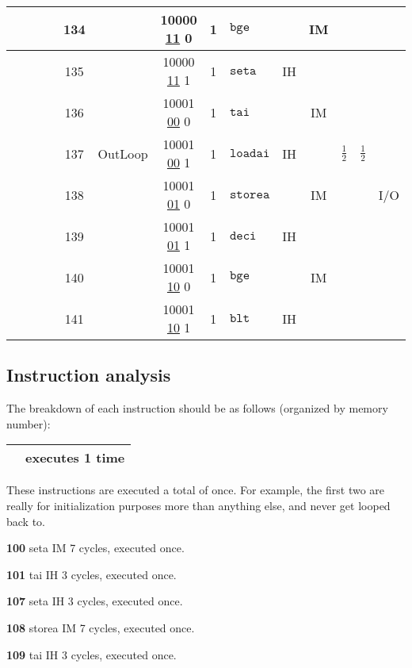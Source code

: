 \documentclass[a4paper]{article}
\begin{document}
\begin{center}
\begin{tabular}{|c|c|c|c|c|c|c|c|l|c|c|c|c|c|}
\hline
& & & \cellcolor{red} & 134 &  & 10000 \underline{11} 0 & 1 & $\texttt{bge}$ &  & IM &  &  &  \\
\hline
\cellcolor{black} & & & & 135 &  & 10000 \underline{11} 1 & 1 & $\texttt{seta}$ & IH &  &  &  &  \\
\hline
\cellcolor{black} & & & & 136 &  & 10001 \underline{00} 0 & 1 & $\texttt{tai}$ &  & IM &  &  &  \\
\hline
& & & \cellcolor{red} & 137 & OutLoop & 10001 \underline{00} 1 & 1 & $\texttt{loadai}$ & IH &  & $\frac{1}{2}$ & $\frac{1}{2}$ &  \\
\hline
& & & \cellcolor{red} & 138 &  & 10001 \underline{01} 0 & 1 & $\texttt{storea}$ & & IM &  &  & I/O \\
\hline
& & & \cellcolor{red} & 139 &  & 10001 \underline{01} 1 & 1 & $\texttt{deci}$ & IH &  &  &  &  \\
\hline
& & & \cellcolor{red} & 140 &  & 10001 \underline{10} 0 & 1 & $\texttt{bge}$ &  & IM &  &  &  \\
\hline
\cellcolor{black} & & & & 141 &  & 10001 \underline{10} 1 & 1 & $\texttt{blt}$ & IH &  &  &  &  \\
\hline
\end{tabular}
\end{center}

\pagebreak[4]

\subsection*{Instruction analysis} The breakdown of each instruction should be as follows (organized by memory number):\\

\begin{tabular}{|c|c|}
\hline
\cellcolor{black} & executes 1 time \\
\hline
\end{tabular}

These instructions are executed a total of once. For example, the first two are really for initialization purposes more than anything else, and never get looped back to.

\textbf{100} seta IM 7 cycles, executed once.

\textbf{101} tai IH 3 cycles, executed once.

\textbf{107} seta IH 3 cycles, executed once.

\textbf{108} storea IM 7 cycles, executed once.

\textbf{109} tai IH 3 cycles, executed once.
\end{document}
